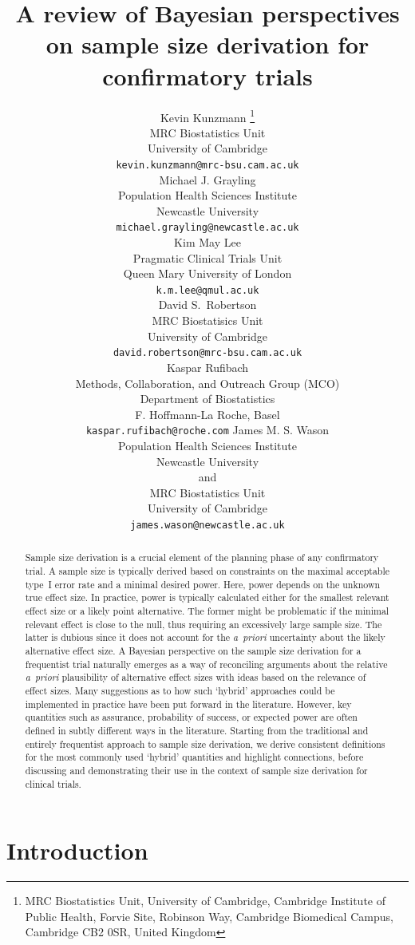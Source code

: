 \documentclass{article}
\title{A review of Bayesian perspectives on sample size derivation for confirmatory trials}
\author{
  Kevin Kunzmann \thanks{
        MRC Biostatistics Unit, University of Cambridge,
        Cambridge Institute of Public Health,
        Forvie Site, Robinson Way,
        Cambridge Biomedical Campus,
        Cambridge CB2 0SR,
        United Kingdom
    }\\
    MRC Biostatistics Unit \\
    University of Cambridge \\
    \texttt{kevin.kunzmann@mrc-bsu.cam.ac.uk} \\
    \And
    Michael J. Grayling \\
    Population Health Sciences Institute \\
    Newcastle University \\
    \texttt{michael.grayling@newcastle.ac.uk} \\
    \And
    Kim May Lee \\
    Pragmatic Clinical Trials Unit\\
    Queen Mary University of London\\
    \texttt{k.m.lee@qmul.ac.uk} \\
    \And
    David S.\ Robertson \\
    MRC Biostatisics Unit\\
    University of Cambridge\\
    \texttt{david.robertson@mrc-bsu.cam.ac.uk} \\
    \And
    Kaspar Rufibach \\
    Methods, Collaboration, and Outreach Group (MCO) \\
    Department of Biostatistics\\
    F. Hoffmann-La Roche, Basel\\
    \texttt{kaspar.rufibach@roche.com}
     \And
    James M. S. Wason \\
    Population Health Sciences Institute \\
    Newcastle University\\
    and \\
     MRC Biostatistics Unit \\
    University of Cambridge \\
    \texttt{james.wason@newcastle.ac.uk}
}
\begin{document}
\maketitle

\captionsetup{width=\textwidth}

\begin{abstract}
Sample size derivation is a crucial element of the planning phase of any confirmatory trial.
A sample size is typically derived based on
constraints on the maximal acceptable type~I error rate and a
minimal desired power.
Here, power depends on the unknown true effect size.
In practice, power is typically calculated either for the smallest relevant effect size or a likely point alternative.
The former might be problematic if the minimal relevant effect is close to the null, thus requiring an excessively large sample size.
The latter is dubious since it does not account for the \textit{a~priori} uncertainty about the likely alternative effect size.
A Bayesian perspective on the sample size derivation for a frequentist
trial naturally emerges as a way of reconciling arguments about the relative \textit{a~priori} plausibility of alternative effect sizes with ideas based on the relevance of effect sizes.
Many suggestions as to how such `hybrid' approaches could be implemented in practice have been put forward in the literature.
However, key quantities such as assurance, probability of success, or expected power are often defined in subtly different ways in the literature.
Starting from the traditional and entirely frequentist approach to sample size derivation, we derive consistent definitions for the most commonly used
`hybrid' quantities and highlight connections, before discussing and demonstrating their use in the context of sample size derivation for clinical trials.
\end{abstract}



\section{Introduction}
\label{sec:intro}
\end{document}
